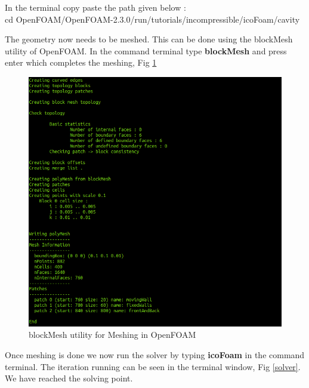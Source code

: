 \documentclass[a4paper,12pt]{report}
\begin{document}
\flushleft In the terminal copy paste the path given below :\\

\center cd OpenFOAM/OpenFOAM-2.3.0/run/tutorials/incompressible/icoFoam/cavity

\flushleft The geometry now needs to be meshed. This can be done using the blockMesh utility of OpenFOAM. In the command terminal type \textbf{blockMesh} and press enter which completes the meshing, Fig \ref{mesh}

\begin{figure}[ht]  
\begin{center}  
\includegraphics[scale=0.3]{blockMesh.png}
\caption{blockMesh utility for Meshing in OpenFOAM}
\label{mesh}
\end{center}  
\end{figure}
\vspace{1cm}
\flushleft Once meshing is done we now run the solver by typing \textbf{icoFoam} in the command terminal. The iteration running can be seen in the terminal window, Fig \ref{solver}. We have reached the solving point.
\end{document}
